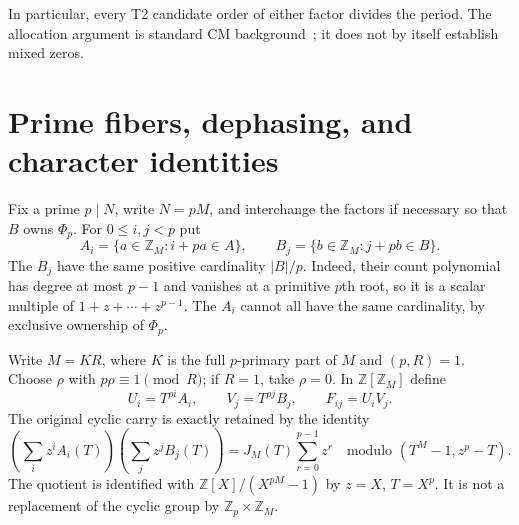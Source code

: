 \documentclass[10pt,a4paper]{amsart}
\newcommand{\Z}{\mathbb Z}
\newcommand{\PhiC}{\Phi}
\begin{document}
In particular, every T2 candidate order of either factor divides the period. The allocation argument is standard CM background~\cite[Lemma 2.1]{CM}; it does not by itself establish mixed zeros.

\section{Prime fibers, dephasing, and character identities}
Fix a prime $p\mid N$, write $N=pM$, and interchange the factors if necessary so that $B$ owns $\PhiC_p$. For $0\le i,j<p$ put
\[
 A_i=\{a\in\Z_M:i+pa\in A\},\qquad
 B_j=\{b\in\Z_M:j+pb\in B\}.
\]
The $B_j$ have the same positive cardinality $|B|/p$. Indeed, their count polynomial has degree at most $p-1$ and vanishes at a primitive $p$th root, so it is a scalar multiple of $1+z+\cdots+z^{p-1}$. The $A_i$ cannot all have the same cardinality, by exclusive ownership of $\PhiC_p$.

Write $M=KR$, where $K$ is the full $p$-primary part of $M$ and $(p,R)=1$. Choose $\rho$ with $p\rho\equiv1\pmod R$; if $R=1$, take $\rho=0$. In $\Z[\Z_M]$ define
\[
 U_i=T^{\rho i}A_i,\qquad V_j=T^{\rho j}B_j,\qquad F_{ij}=U_iV_j.
\]
The original cyclic carry is exactly retained by the identity
\begin{equation}\label{eq:carry}
 \left(\sum_i z^iA_i(T)\right)\left(\sum_j z^jB_j(T)\right)
 =J_M(T)\sum_{r=0}^{p-1}z^r
 \quad\text{modulo }(T^M-1,z^p-T).
\end{equation}
The quotient is identified with $\Z[X]/(X^{pM}-1)$ by $z=X$, $T=X^p$. It is not a replacement of the cyclic group by $\Z_p\times\Z_M$.
\end{document}
